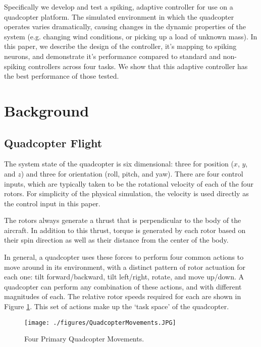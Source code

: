 \documentclass[letterpaper, 10 pt, conference]{ieeeconf}  %
\begin{document}
Specifically we develop and test a spiking, adaptive controller for use on a quadcopter platform.
The simulated environment in which the quadcopter operates varies dramatically, causing changes in the dynamic properties of the system (e.g. changing wind conditions, or picking up a load of unknown mass).
In this paper, we describe the design of the controller, it's mapping to spiking neurons, and demonstrate it's performance compared to standard and non-spiking controllers across four tasks. %
We show that this adaptive controller has the best performance of those tested. %

\section{Background}

\subsection{Quadcopter Flight}

The system state of the quadcopter is six dimensional: three for position ($x$, $y$, and $z$) and three for orientation (roll, pitch, and yaw). 
There are four control inputs, which are typically taken to be the rotational velocity of each of the four rotors. For simplicity of the physical simulation, the velocity is used directly as the control input in this paper. 

The rotors always generate a thrust that is perpendicular to the body of the aircraft. 
In addition to this thrust, torque is generated by each rotor based on their spin direction  as well as their distance from the center of the body.

In general, a quadcopter uses these forces to perform four common actions to move around in its environment, with a distinct pattern of rotor actuation for each one: 
tilt forward/backward, tilt left/right, rotate, and move up/down. 
A quadcopter can perform any combination of these actions, and with different magnitudes of each. The relative rotor speeds required for each are shown in Figure \ref{fig:actions}. This set of actions make up the `task space' of the quadcopter.

\begin{figure}
\centering
\texttt{[image: ./figures/QuadcopterMovements.JPG]}
\caption{Four Primary Quadcopter Movements. \cite{harsha}}
\label{fig:actions}
\end{figure}
\end{document}
